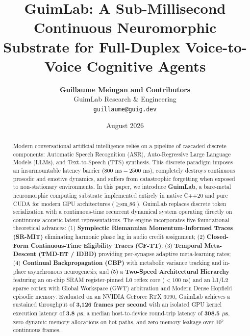 \documentclass[10pt,twocolumn,letterpaper]{article}
\title{\textbf{GuimLab: A Sub-Millisecond Continuous Neuromorphic Substrate for Full-Duplex Voice-to-Voice Cognitive Agents}}
\author{
  \textbf{Guillaume Meingan and Contributors} \\
  GuimLab Research \& Engineering \\
  \texttt{guillaume@guig.dev}
}
\date{August 2026}
\begin{document}
\maketitle

\begin{abstract}
Modern conversational artificial intelligence relies on a pipeline of cascaded discrete components: Automatic Speech Recognition (ASR), Auto-Regressive Large Language Models (LLMs), and Text-to-Speech (TTS) synthesis. This discrete paradigm imposes an insurmountable latency barrier ($800\text{ ms} - 2500\text{ ms}$), completely destroys continuous prosodic and emotive dynamics, and suffers from catastrophic forgetting when exposed to non-stationary environments. In this paper, we introduce \textbf{GuimLab}, a bare-metal neuromorphic computing substrate implemented entirely in native C++20 and pure CUDA for modern GPU architectures ($\ge\text{sm\_86}$). GuimLab replaces discrete token serialization with a continuous-time recurrent dynamical system operating directly on continuous acoustic latent representations. The engine incorporates five foundational theoretical advances: (1) \textbf{Symplectic Riemannian Momentum-Informed Traces (SR-MIT)} eliminating harmonic phase lag in audio credit assignment; (2) \textbf{Closed-Form Continuous-Time Eligibility Traces (CF-TT)}; (3) \textbf{Temporal Meta-Descent (TMD-ET / IDBD)} providing per-synapse adaptive meta-learning rates; (4) \textbf{Continual Backpropagation (CBP)} with metabolic variance tracking and in-place asynchronous neurogenesis; and (5) a \textbf{Two-Speed Architectural Hierarchy} featuring an on-chip SRAM register-pinned L0 reflex core ($< 100\text{ ns}$) and an L1/L2 sparse cortex with Global Workspace (GWT) arbitration and Modern Dense Hopfield episodic memory. Evaluated on an NVIDIA GeForce RTX 3090, GuimLab achieves a sustained throughput of \textbf{3,126 frames per second} with an isolated GPU kernel execution latency of \textbf{3.8 $\mu$s}, a median host-to-device round-trip latency of \textbf{308.5 $\mu$s}, zero dynamic memory allocations on hot paths, and zero memory leakage over $10^5$ continuous frames.
\end{abstract}
\end{document}
